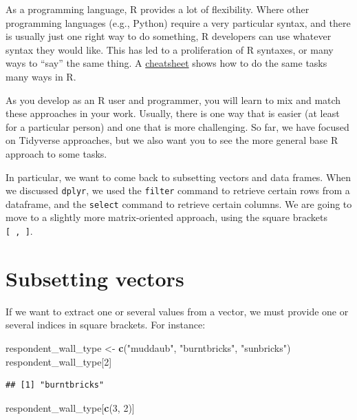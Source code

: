 \documentclass[]{book}
\newenvironment{Shaded}{\begin{snugshade}}{\end{snugshade}}
\newcommand{\KeywordTok}[1]{\textcolor[rgb]{0.13,0.29,0.53}{\textbf{#1}}}
\newcommand{\DecValTok}[1]{\textcolor[rgb]{0.00,0.00,0.81}{#1}}
\newcommand{\StringTok}[1]{\textcolor[rgb]{0.31,0.60,0.02}{#1}}
\newcommand{\NormalTok}[1]{#1}
\begin{document}
As a programming language, R provides a lot of flexibility. Where other
programming languages (e.g., Python) require a very particular syntax,
and there is usually just one right way to do something, R developers
can use whatever syntax they would like. This has led to a proliferation
of R syntaxes, or many ways to ``say'' the same thing. A
\href{https://github.com/rstudio/cheatsheets/raw/master/syntax.pdf}{cheatsheet}
shows how to do the same tasks many ways in R.

As you develop as an R user and programmer, you will learn to mix and
match these approaches in your work. Usually, there is one way that is
easier (at least for a particular person) and one that is more
challenging. So far, we have focused on Tidyverse approaches, but we
also want you to see the more general base R approach to some tasks.

In particular, we want to come back to subsetting vectors and data
frames. When we discussed \texttt{dplyr}, we used the \texttt{filter}
command to retrieve certain rows from a dataframe, and the
\texttt{select} command to retrieve certain columns. We are going to
move to a slightly more matrix-oriented approach, using the square
brackets \texttt{{[}\ ,\ {]}}.

\section{Subsetting vectors}\label{subsetting-vectors}

If we want to extract one or several values from a vector, we must
provide one or several indices in square brackets. For instance:

\begin{Shaded}
\begin{Highlighting}[]
\NormalTok{respondent_wall_type <-}\StringTok{ }\KeywordTok{c}\NormalTok{(}\StringTok{"muddaub"}\NormalTok{, }\StringTok{"burntbricks"}\NormalTok{, }\StringTok{"sunbricks"}\NormalTok{)}
\NormalTok{respondent_wall_type[}\DecValTok{2}\NormalTok{]}
\end{Highlighting}
\end{Shaded}

\begin{verbatim}
## [1] "burntbricks"
\end{verbatim}

\begin{Shaded}
\begin{Highlighting}[]
\NormalTok{respondent_wall_type[}\KeywordTok{c}\NormalTok{(}\DecValTok{3}\NormalTok{, }\DecValTok{2}\NormalTok{)]}
\end{Highlighting}
\end{Shaded}
\end{document}
